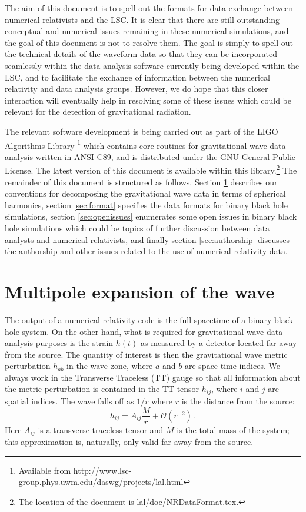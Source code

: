 \documentclass[10pt]{ligodcc}
\renewcommand{\texttt}[1]{{\ttfamily\color{blue}#1}}
\begin{document}
The aim of this document is to spell out the formats for data exchange
between numerical relativists and the LSC.  It is clear that there are
still outstanding conceptual and numerical issues remaining in these
numerical simulations, and the goal of this document is not to resolve
them.  The goal is simply to spell out the technical details of the
waveform data so that they can be incorporated seamlessly within the
data analysis software currently being developed within the LSC, and
to facilitate the exchange of information between the numerical
relativity and data analysis groups.  However, we do hope that this
closer interaction will eventually help in resolving some of these
issues which could be relevant for the detection of gravitational
radiation.

The relevant software development is being carried out as part of the
LIGO Algorithms Library \footnote{Available from
  \texttt{http://www.lsc-group.phys.uwm.edu/daswg/projects/lal.html}}
which contains core routines for gravitational wave data analysis
written in ANSI C89, and is distributed under the GNU General Public
License.  The latest version of this document is available within this
library.\footnote{The location of the document is
  \texttt{lal/doc/NRDataFormat.tex}.}  The remainder of this document
is structured as follows.  Section \ref{sec:multipoles} describes our
conventions for decomposing the gravitational wave data in terms of
spherical harmonics, section \ref{sec:format} specifies the data
formats for binary black hole simulations, section
\ref{sec:openissues} enumerates some open issues in binary black hole
simulations which could be topics of further discussion between data
analysts and numerical relativists, and finally section
\ref{sec:authorship} discusses the authorship and other issues related
to the use of numerical relativity data.



\section{Multipole expansion of the wave}
\label{sec:multipoles}


The output of a numerical relativity code is the full spacetime of a
binary black hole system. On the other hand, what is required for
gravitational wave data analysis purposes is the strain $h(t)$ as
measured by a detector located far away from the source.  The quantity
of interest is then the gravitational wave metric perturbation
$h_{ab}$ in the wave-zone, where $a$ and $b$ are space-time indices.
We always work in the Transverse Traceless (TT) gauge so that all
information about the metric perturbation is contained in the TT
tensor $h_{ij}$, where $i$ and $j$ are spatial indices.  The wave
falls off as $1/r$ where $r$ is the distance from the source:
\begin{equation}
  \label{eq:1}
  h_{ij} = A_{ij}\frac{M}{r} + \mathcal{O}\left(r^{-2}\right)\,.
\end{equation}
Here $A_{ij}$ is a transverse traceless tensor and $M$ is the total
mass of the system; this approximation is, naturally, only valid far
away from the source.
\end{document}
